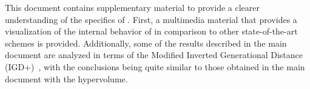 This document contains supplementary material to provide a clearer understanding of the 
specifics of \VSDMOEA{}.
%
First, a multimedia material that provides a visualization of the internal behavior
of \VSDMOEA{} in comparison to other state-of-the-art schemes is provided.
%
Additionally, some of the results described in the main document are analyzed in terms
of the Modified Inverted Generational Distance (IGD+)~\cite{Joel:Inverted_Generational_Distance_Plus}, 
with the conclusions being quite similar to those obtained in the main document with
the hypervolume.
